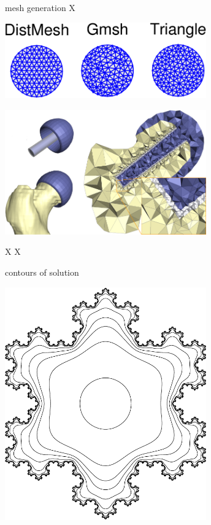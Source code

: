 \documentclass[hide notes,intlimits,usenames,dvipsnames]{beamer}
\begin{document}
\begin{frame}{mesh generation}
X

\includegraphics[width=0.65\textwidth]{meshcomparison}

\includegraphics[width=0.65\textwidth]{hipjoint}
\end{frame}


\begin{frame}{X}
X

 \qquad 
\end{frame}


\begin{frame}{contours of solution}
\begin{center}
\includegraphics[width=0.65\textwidth]{snowflake}
\end{center}
\end{frame}
\end{document}
